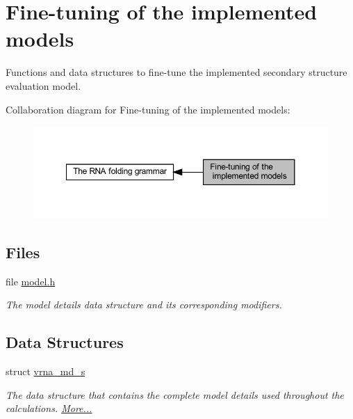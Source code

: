 \hypertarget{group__model__details}{}\section{Fine-\/tuning of the implemented models}
\label{group__model__details}


Functions and data structures to fine-\/tune the implemented secondary structure evaluation model.  


Collaboration diagram for Fine-\/tuning of the implemented models\+:
\nopagebreak
\begin{figure}[H]
\begin{center}
\leavevmode
\includegraphics[width=350pt]{group__model__details}
\end{center}
\end{figure}
\subsection*{Files}
\begin{DoxyCompactItemize}
\item 
file \hyperlink{model_8h}{model.\+h}
\begin{DoxyCompactList}\small\item\em The model details data structure and its corresponding modifiers. \end{DoxyCompactList}\end{DoxyCompactItemize}
\subsection*{Data Structures}
\begin{DoxyCompactItemize}
\item 
struct \hyperlink{group__model__details_structvrna__md__s}{vrna\+\_\+md\+\_\+s}
\begin{DoxyCompactList}\small\item\em The data structure that contains the complete model details used throughout the calculations.  \hyperlink{group__model__details_structvrna__md__s}{More...}\end{DoxyCompactList}\end{DoxyCompactItemize}
